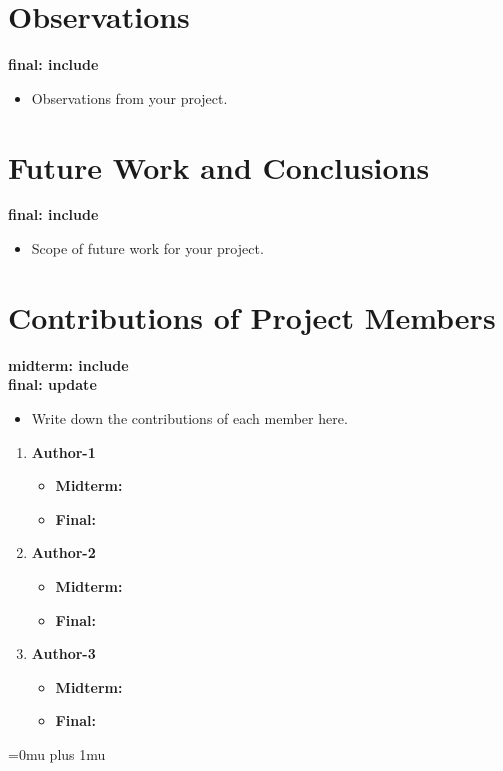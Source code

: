 \documentclass[twocolumn]{article}
\newcommand{\red}[1]{{\bf \color{red}#1}}
\newcommand{\blue}[1]{{\bf \color{blue}#1}}
\begin{document}
\section{Observations}
\blue{
final: include\\
}

\red{
\begin{itemize}
\itemsep0em
\item Observations from your project.
\end{itemize}
}


\section{Future Work and Conclusions}
\blue{
final: include\\
}

\red{
\begin{itemize}
\itemsep0em
\item Scope of future work for your project.
\end{itemize}
}


\section{Contributions of Project Members}
\blue{
midterm: include\\
final: update\\
}

\red{
\begin{itemize}
\itemsep0em
\item Write down the contributions of each member here.
\end{itemize}
}


\begin{enumerate}
\item {\bf Author-1}
\begin{itemize}
\item {\bf Midterm:}
\item {\bf Final:}
\end{itemize}
\item {\bf Author-2}
\begin{itemize}
\item {\bf Midterm:}
\item {\bf Final:}
\end{itemize}
\item {\bf Author-3}
\begin{itemize}
\item {\bf Midterm:}
\item {\bf Final:}
\end{itemize}
\end{enumerate}

\Urlmuskip=0mu plus 1mu\relax


\end{document}
